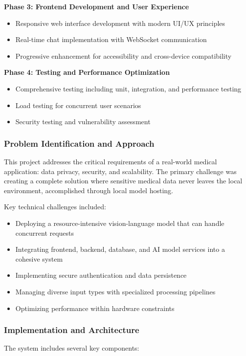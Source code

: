 \documentclass[12pt,a4paper]{article}
\begin{document}
\textbf{Phase 3: Frontend Development and User Experience}
\begin{itemize}
    \item Responsive web interface development with modern UI/UX principles
    \item Real-time chat implementation with WebSocket communication
    \item Progressive enhancement for accessibility and cross-device compatibility
\end{itemize}

\textbf{Phase 4: Testing and Performance Optimization}
\begin{itemize}
    \item Comprehensive testing including unit, integration, and performance testing
    \item Load testing for concurrent user scenarios
    \item Security testing and vulnerability assessment
\end{itemize}

\subsubsection{Problem Identification and Approach}
This project addresses the critical requirements of a real-world medical application: data privacy, security, and scalability. The primary challenge was creating a complete solution where sensitive medical data never leaves the local environment, accomplished through local model hosting.

Key technical challenges included:
\begin{itemize}
    \item Deploying a resource-intensive vision-language model that can handle concurrent requests
    \item Integrating frontend, backend, database, and AI model services into a cohesive system
    \item Implementing secure authentication and data persistence
    \item Managing diverse input types with specialized processing pipelines
    \item Optimizing performance within hardware constraints
\end{itemize}


\subsubsection{Implementation and Architecture}
The system includes several key components:
\end{document}
